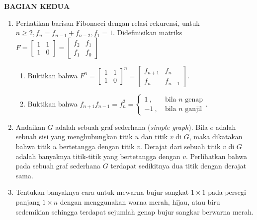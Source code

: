 \documentclass[12pt,twoside]{article}
\begin{document}
\newpage \textbf{BAGIAN KEDUA}
\begin{enumerate}
	\item Perhatikan barisan Fibonacci dengan relasi rekurensi, untuk $n \geq 2, f_n = f_{n-1}+f_{n-2} , f_1 = 1  $. Didefinisikan matriks $F = \left[ \begin{array}{cc}
				      1 & 1 \\1&0
			      \end{array} \right] = \left[ \begin{array}{cc}
				      f_2 & f_1 \\f_1&f_0
			      \end{array} \right]$
	      \begin{enumerate}
		      \item Buktikan bahwa $F^n = \left[ \begin{array}{cc}
					            1 & 1 \\1&0
				            \end{array} \right]^n = \left[ \begin{array}{cc}
					            f_{n+1} & f_n \\f_n&f_{n-1}
				            \end{array} \right]$.

		      \item Buktikan bahwa $f_{n+1}f_{n-1}=f^2_n = \begin{cases}
				            1~,~ & \text{bila $n$ genap} \\-1~,~&\text{bila $n$ ganjil}
			            \end{cases}$.
	      \end{enumerate}

	\item Andaikan $G$ adalah sebuah graf sederhana (\textit{simple graph}). Bila $e$ adalah sebuah sisi yang menghubungkan titik $u$ dan titik $v$ di $G$, maka dikatakan bahwa titik $u$ bertetangga dengan titik $v$. Derajat dari sebuah titik $v$ di $G$ adalah banyaknya titik-titik yang bertetangga dengan $v$. Perlihatkan bahwa pada sebuah graf sederhana $G$ terdapat sedikitnya dua titik dengan derajat sama.

	\item Tentukan banyaknya cara untuk mewarna bujur sangkat $1 \times 1$ pada persegi panjang $1 \times n$ dengan menggunakan warna merah, hijau, atau biru sedemikian sehingga terdapat sejumlah genap bujur sangkar berwarna merah.
\end{enumerate}

\pagebreak
\end{document}
